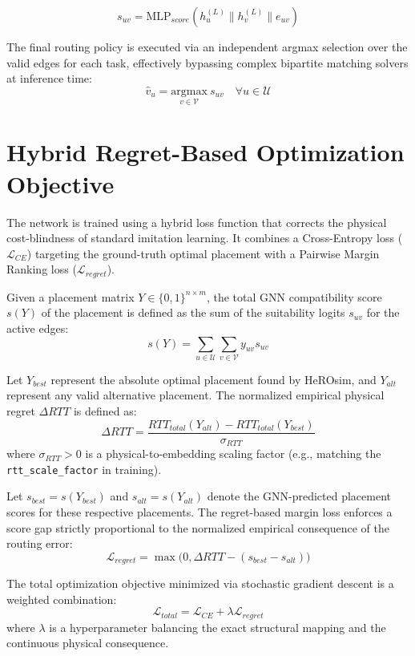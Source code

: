 \documentclass[11pt]{article}
\begin{document}
\begin{equation}
s_{uv} = \text{MLP}_{score} \left( h_u^{(L)} \parallel h_v^{(L)} \parallel e_{uv} \right)
\end{equation}

The final routing policy is executed via an independent argmax selection over the valid edges for each task, effectively bypassing complex bipartite matching solvers at inference time:
\begin{equation}
\hat{v}_u = \underset{v \in \mathcal{V}}{\mathrm{argmax}} \ s_{uv} \quad \forall u \in \mathcal{U}
\end{equation}

\section{Hybrid Regret-Based Optimization Objective}
The network is trained using a hybrid loss function that corrects the physical cost-blindness of standard imitation learning. It combines a Cross-Entropy loss ($\mathcal{L}_{CE}$) targeting the ground-truth optimal placement with a Pairwise Margin Ranking loss ($\mathcal{L}_{regret}$).

Given a placement matrix $Y \in \{0, 1\}^{n \times m}$, the total GNN compatibility score $s(Y)$ of the placement is defined as the sum of the suitability logits $s_{uv}$ for the active edges:
\begin{equation}
s(Y) = \sum_{u \in \mathcal{U}} \sum_{v \in \mathcal{V}} y_{uv} s_{uv}
\end{equation}

Let $Y_{best}$ represent the absolute optimal placement found by HeROsim, and $Y_{alt}$ represent any valid alternative placement. The normalized empirical physical regret $\Delta RTT$ is defined as:
\begin{equation}
\Delta RTT = \frac{RTT_{total}(Y_{alt}) - RTT_{total}(Y_{best})}{\sigma_{RTT}}
\end{equation}
where $\sigma_{RTT} > 0$ is a physical-to-embedding scaling factor (e.g., matching the \texttt{rtt\_scale\_factor} in training).

Let $s_{best} = s(Y_{best})$ and $s_{alt} = s(Y_{alt})$ denote the GNN-predicted placement scores for these respective placements. The regret-based margin loss enforces a score gap strictly proportional to the normalized empirical consequence of the routing error:
\begin{equation}
\mathcal{L}_{regret} = \max\Big(0, \Delta RTT - (s_{best} - s_{alt})\Big)
\end{equation}

The total optimization objective minimized via stochastic gradient descent is a weighted combination:
\begin{equation}
\mathcal{L}_{total} = \mathcal{L}_{CE} + \lambda \mathcal{L}_{regret}
\end{equation}
where $\lambda$ is a hyperparameter balancing the exact structural mapping and the continuous physical consequence.
\end{document}
